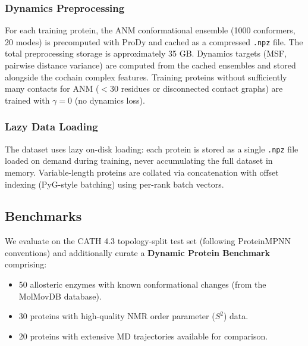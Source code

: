 \documentclass{article}
\begin{document}
\subsubsection{Dynamics Preprocessing}
For each training protein, the ANM conformational ensemble (1000 conformers, 20 modes) is precomputed with ProDy and cached as a compressed \texttt{.npz} file. The total preprocessing storage is approximately 35 GB. Dynamics targets (MSF, pairwise distance variance) are computed from the cached ensembles and stored alongside the cochain complex features. Training proteins without sufficiently many contacts for ANM ($<30$ residues or disconnected contact graphs) are trained with $\gamma = 0$ (no dynamics loss).

\subsubsection{Lazy Data Loading}
The dataset uses lazy on-disk loading: each protein is stored as a single \texttt{.npz} file loaded on demand during training, never accumulating the full dataset in memory. Variable-length proteins are collated via concatenation with offset indexing (PyG-style batching) using per-rank batch vectors.

\subsection{Benchmarks}
We evaluate on the CATH 4.3 topology-split test set (following ProteinMPNN conventions) and additionally curate a \textbf{Dynamic Protein Benchmark} comprising:
\begin{itemize}
    \item 50 allosteric enzymes with known conformational changes (from the MolMovDB database).
    \item 30 proteins with high-quality NMR order parameter ($S^2$) data.
    \item 20 proteins with extensive MD trajectories available for comparison.
\end{itemize}
\end{document}
